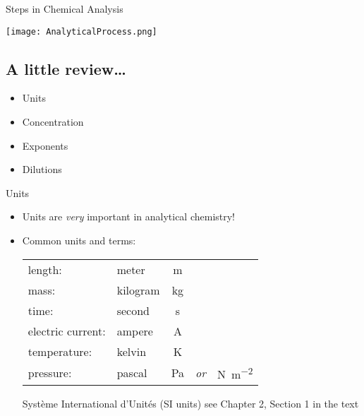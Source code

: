 \documentclass[notes=show]{beamer}
\begin{document}
\begin{frame}{Steps in Chemical Analysis}
	\begin{center}
		\texttt{[image: AnalyticalProcess.png]}
	\end{center}
\end{frame}

\begin{frame}
	\section{A little review\ldots}
	\begin{center}
	\parbox{0.5\linewidth}{
	\begin{itemize}
		\item Units
		\item Concentration
		\item Exponents
		\item Dilutions
	\end{itemize}
}
\end{center}
\end{frame}

\begin{frame}{Units}
	\begin{itemize}
		\item Units are \emph{very} important in analytical chemistry!

		\item Common units and terms:
	\begin{center}
	\begin{tabular} {l l c c c}
		length: & meter & \si{\meter} \\
		mass: & kilogram & \si{\kilo\gram} \\
		time: & second & \si{\second} \\
		electric current: & ampere & \si{\ampere} \\
		temperature: & kelvin & \si{\kelvin} \\
		pressure: & pascal & \si{\pascal} & \emph{or} &
			\si{\newton\per\meter\squared} \\
	\end{tabular}
	\end{center}

	\begin{block}{Syst\`{e}me International d'Unit\'{e}s (SI units)}
		see Chapter 2, Section 1 in the text
	\end{block}
	\end{itemize}
\end{frame}
\end{document}
